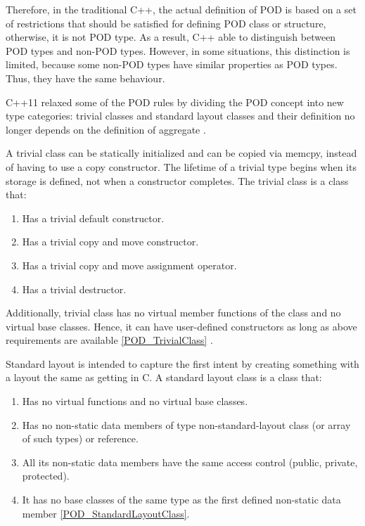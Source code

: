 \documentclass[11pt]{report}
\begin{document}
Therefore, in the traditional C++, the actual definition of POD is based on a set of restrictions that should be satisfied for defining POD class or structure, otherwise, it is not POD type. As a result, C++ able to distinguish between POD types and non-POD types. However, in some situations, this distinction is limited, because some non-POD types have similar properties as POD types. Thus, they have the same behaviour.
\newline

C++11 relaxed some of the POD rules by dividing the POD concept into new type categories: trivial classes and standard layout classes and their definition no longer depends on the definition of aggregate \cite{MSDN:2012:CppModern}.
\newline

A trivial class can be statically initialized and can be copied via memcpy, instead of having to use a copy constructor. The lifetime of a trivial type begins when its storage is defined, not when a constructor completes. The trivial class is a class that:

\begin{enumerate}
\item	Has a trivial default constructor. 
\item	Has a trivial copy and move constructor.
\item	Has a trivial copy and move assignment operator.
\item	Has a trivial destructor.
\end{enumerate}

Additionally, trivial class has no virtual member functions of the class and no virtual base classes. Hence, it can have user-defined constructors as long as above requirements are available \ref{POD_TrivialClass} \cite{ISO:2011:Cpplanguage}.

Standard layout is intended to capture the first intent by creating something with a layout the same as getting in C. A standard layout class is a class that:

\begin{enumerate}
\item	Has no virtual functions and no virtual base classes.
\item	Has no non-static data members of type non-standard-layout class (or array of such types) or reference.
\item	All its non-static data members have the same access control (public, private, protected).
\item	It has no base classes of the same type as the first defined non-static data member \ref{POD_StandardLayoutClass}.
\end{enumerate}
\end{document}
